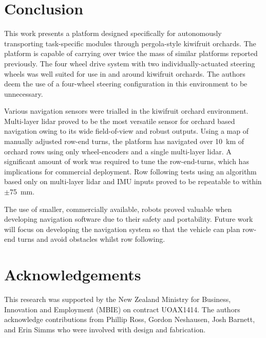 \documentclass[preprint,authoryear,12pt]{elsarticle}
\begin{document}
\section{Conclusion}
    This work presents a platform designed specifically for autonomously transporting task-specific modules through pergola-style kiwifruit orchards.
    The platform is capable of carrying over twice the mass of similar platforms reported previously.
    The four wheel drive system with two individually-actuated steering wheels was well suited for use in and around kiwifruit orchards.
    The authors deem the use of a four-wheel steering configuration in this environment to be unnecessary.

    Various navigation sensors were trialled in the kiwifruit orchard environment.
    Multi-layer lidar proved to be the most versatile sensor for orchard based navigation owing to its wide field-of-view and robust outputs.
    Using a map of manually adjusted row-end turns, the platform has navigated over \SI{10}{\kilo\meter} of orchard rows using only wheel-encoders and a single multi-layer lidar.
    A significant amount of work was required to tune the row-end-turns, which has implications for commercial deployment.
    Row following tests using an algorithm based only on multi-layer lidar and IMU inputs proved to be repeatable to within $\pm$\SI{75}{\milli\meter}.

    The use of smaller, commercially available, robots proved valuable when developing navigation software due to their safety and portability.
    Future work will focus on developing the navigation system so that the vehicle can plan row-end turns and avoid obstacles whilst row following.


\section*{Acknowledgements}
This research was supported by the New Zealand Ministry for Business, Innovation and Employment (MBIE) on contract UOAX1414.
The authors acknowledge contributions from Phillip Ross, Gordon Neshausen, Josh Barnett, and Erin Simms who were involved with design and fabrication.



\end{document}
